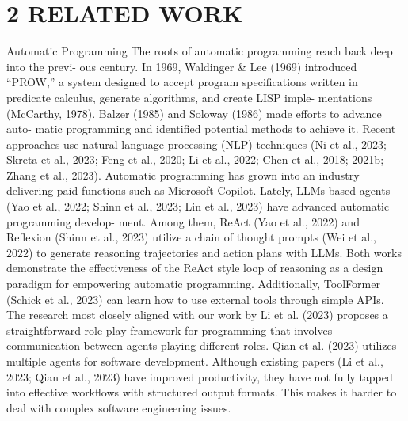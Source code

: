 \documentclass[12pt]{article}
\begin{document}
\section{2 RELATED WORK}


Automatic Programming The roots of automatic programming reach back deep into the previ-
ous century. In 1969, Waldinger & Lee (1969) introduced “PROW,” a system designed to accept
program specifications written in predicate calculus, generate algorithms, and create LISP imple-
mentations (McCarthy, 1978). Balzer (1985) and Soloway (1986) made efforts to advance auto-
matic programming and identified potential methods to achieve it. Recent approaches use natural
language processing (NLP) techniques (Ni et al., 2023; Skreta et al., 2023; Feng et al., 2020; Li
et al., 2022; Chen et al., 2018; 2021b; Zhang et al., 2023). Automatic programming has grown into
an industry delivering paid functions such as Microsoft Copilot. Lately, LLMs-based agents (Yao
et al., 2022; Shinn et al., 2023; Lin et al., 2023) have advanced automatic programming develop-
ment. Among them, ReAct (Yao et al., 2022) and Reflexion (Shinn et al., 2023) utilize a chain of
thought prompts (Wei et al., 2022) to generate reasoning trajectories and action plans with LLMs.
Both works demonstrate the effectiveness of the ReAct style loop of reasoning as a design paradigm
for empowering automatic programming. Additionally, ToolFormer (Schick et al., 2023) can learn
how to use external tools through simple APIs. The research most closely aligned with our work
by Li et al. (2023) proposes a straightforward role-play framework for programming that involves
communication between agents playing different roles. Qian et al. (2023) utilizes multiple agents for
software development. Although existing papers (Li et al., 2023; Qian et al., 2023) have improved
productivity, they have not fully tapped into effective workflows with structured output formats.
This makes it harder to deal with complex software engineering issues.
\end{document}
